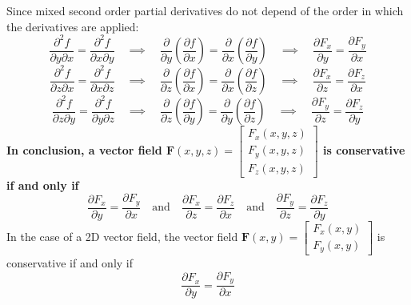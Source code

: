 \documentclass{article}
\begin{document}
Since mixed second order partial derivatives do not depend of the order in which the derivatives are applied:
\[\frac{\partial^2 f}{\partial y \partial x} = \frac{\partial^2 f}{\partial x \partial y} \quad\implies\quad \frac{\partial}{\partial y}\left(\frac{\partial f}{\partial x}\right) = \frac{\partial}{\partial x}\left(\frac{\partial f}{\partial y}\right) \quad\implies\quad \frac{\partial F_x}{\partial y} = \frac{\partial F_y}{\partial x}\]
\[\frac{\partial^2 f}{\partial z \partial x} = \frac{\partial^2 f}{\partial x \partial z} \quad\implies\quad \frac{\partial}{\partial z}\left(\frac{\partial f}{\partial x}\right) = \frac{\partial}{\partial x}\left(\frac{\partial f}{\partial z}\right) \quad\implies\quad \frac{\partial F_x}{\partial z} = \frac{\partial F_z}{\partial x}\]
\[\frac{\partial^2 f}{\partial z \partial y} = \frac{\partial^2 f}{\partial y \partial z} \quad\implies\quad \frac{\partial}{\partial z}\left(\frac{\partial f}{\partial y}\right) = \frac{\partial}{\partial y}\left(\frac{\partial f}{\partial z}\right) \quad\implies\quad \frac{\partial F_y}{\partial z} = \frac{\partial F_z}{\partial y}\]
{\bf In conclusion, a vector field \(\mathbf{F}(x,y,z) = \begin{bmatrix} F_x(x,y,z) \\ F_y(x,y,z) \\ F_z(x,y,z) \end{bmatrix}\) is conservative if and only if} 
\[\frac{\partial F_x}{\partial y} = \frac{\partial F_y}{\partial x} 
\quad\text{and}\quad 
\frac{\partial F_x}{\partial z} = \frac{\partial F_z}{\partial x} 
\quad\text{and}\quad 
\frac{\partial F_y}{\partial z} = \frac{\partial F_z}{\partial y}\]
In the case of a 2D vector field, the vector field \(\mathbf{F}(x,y) = \begin{bmatrix} F_x(x,y) \\ F_y(x,y) \end{bmatrix}\) is conservative if and only if 
\[\frac{\partial F_x}{\partial y} = \frac{\partial F_y}{\partial x}\]

\vspace{5mm}
\end{document}
